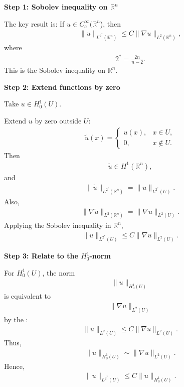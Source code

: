 \documentclass[12pt,a4paper]{report}
\begin{document}
\begin{description}
\begin{description}

\item \textbf{Step 1: Sobolev inequality on $\mathbb R^n$}

The key result is:
If $u\in C_c^\infty(\mathbb R^n$), then
\begin{align*}
\|u\|_{L^{2^*}(\mathbb R^n)} \le C\|\nabla u\|_{L^2(\mathbb R^n)},
\end{align*}
where
\begin{align*}
2^*=\frac{2n}{n-2}.
\end{align*}
This is the Sobolev inequality on $\mathbb R^n$.

\item \textbf{Step 2: Extend functions by zero}

Take $u\in H_0^1(U)$.

Extend $u$ by zero outside $U$:
\begin{align*}
\tilde u(x)=
\begin{cases}
u(x), & x\in U,\\
0, & x\notin U.
\end{cases}
\end{align*}
Then
\begin{align*}
\tilde u\in H^1(\mathbb R^n),
\end{align*}
and
\begin{align*}
\|\tilde u\|_{L^{2^*}(\mathbb R^n)} = \|u\|_{L^{2^*}(U)}.
\end{align*}
Also,
\begin{align*}
\|\nabla \tilde u\|_{L^2(\mathbb R^n)} = \|\nabla u\|_{L^2(U)}.
\end{align*}
Applying the Sobolev inequality in $\mathbb R^n$,
\begin{align*}
\|u\|_{L^{2^*}(U)} \le C\|\nabla u\|_{L^2(U)}.
\end{align*}

\item \textbf{Step 3: Relate to the $H_0^1$-norm}

For $H_0^1(U)$, the norm
\begin{align*}
\|u\|_{H_0^1(U)}
\end{align*}
is equivalent to
\begin{align*}
\|\nabla u\|_{L^2(U)}
\end{align*}
by the :
\begin{align*}
\|u\|_{L^2(U)} \le C\|\nabla u\|_{L^2(U)}.
\end{align*}
Thus,
\begin{align*}
\|u\|_{H_0^1(U)} \sim \|\nabla u\|_{L^2(U)}.
\end{align*}
Hence,
\begin{align*}
\|u\|_{L^{2^*}(U)} \le C\|u\|_{H_0^1(U)}.
\end{align*}


\end{description}
\end{description}
\end{document}
